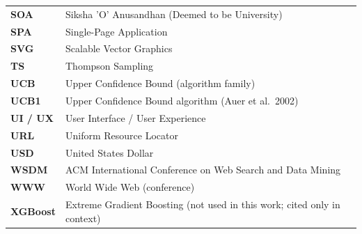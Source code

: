 \begin{xltabular}{\linewidth}{@{}p{3.5cm} X@{}}
\textbf{SOA}        & Siksha 'O' Anusandhan (Deemed to be University)\\
\textbf{SPA}        & Single-Page Application\\
\textbf{SVG}        & Scalable Vector Graphics\\
\textbf{TS}         & Thompson Sampling\\
\textbf{UCB}        & Upper Confidence Bound (algorithm family)\\
\textbf{UCB1}       & Upper Confidence Bound algorithm (Auer et al.\ 2002)\\
\textbf{UI / UX}    & User Interface / User Experience\\
\textbf{URL}        & Uniform Resource Locator\\
\textbf{USD}        & United States Dollar\\
\textbf{WSDM}       & ACM International Conference on Web Search and Data Mining\\
\textbf{WWW}        & World Wide Web (conference)\\
\textbf{XGBoost}    & Extreme Gradient Boosting (not used in this work; cited only in context)\\
\end{xltabular}
\newpage
